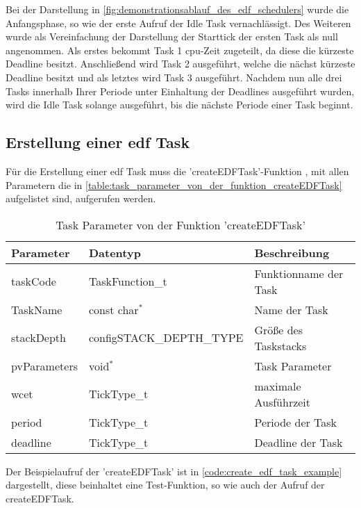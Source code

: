 \documentclass[../EDF Master Thesis.tex]{subfiles}
\begin{document}
    Bei der Darstellung in \autoref{fig:demonstrationsablauf_des_edf_schedulers} wurde die Anfangsphase, so wie der erste Aufruf der Idle Task vernachlässigt.
    Des Weiteren wurde als Vereinfachung der Darstellung der Starttick der ersten Task als null angenommen.
    Als erstes bekommt Task 1 \ac{cpu}-Zeit zugeteilt, da diese die kürzeste Deadline besitzt.
    Anschließend wird Task 2 ausgeführt, welche die nächst kürzeste Deadline besitzt und als letztes wird Task 3 ausgeführt.
    Nachdem nun alle drei Tasks innerhalb Ihrer Periode unter Einhaltung der Deadlines ausgeführt wurden, wird die Idle Task solange ausgeführt, bis die nächste Periode einer Task beginnt.


\subsection{Erstellung einer \ac{edf} Task} \label{section:erstellung_einer_edf_task}

    Für die Erstellung einer \ac{edf} Task muss die 'createEDFTask'-Funktion , mit allen Parametern die in \autoref{table:task_parameter_von_der_funktion_createEDFTask} aufgelistet sind, aufgerufen werden.

    \begin{table}[H]
        \centering
        \begin{tabular}{l|l|l}
            Parameter & Datentyp & Beschreibung \\
            \hline
            taskCode & TaskFunction\_t & Funktionname der Task \\
            TaskName & const char\( ^* \) & Name der Task  \\
            stackDepth & configSTACK\_DEPTH\_TYPE & Größe des Taskstacks \\
            pvParameters & void\( ^* \) & Task Parameter \\
            wcet & TickType\_t & maximale Ausführzeit \\ 
            period & TickType\_t & Periode der Task \\
            deadline & TickType\_t & Deadline der Task \\
        \end{tabular}
        \caption{Task Parameter von der Funktion 'createEDFTask'}
        \label{table:task_parameter_von_der_funktion_createEDFTask}
    \end{table}

    Der Beispielaufruf der 'createEDFTask' ist in \autoref{code:create_edf_task_example} dargestellt, diese beinhaltet eine Test-Funktion, so wie auch der Aufruf der createEDFTask.
\end{document}
